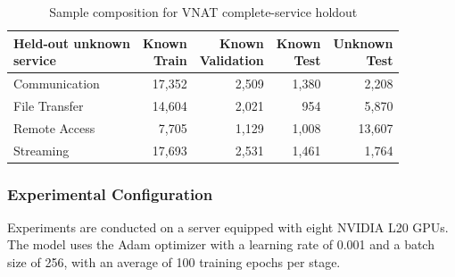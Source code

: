 \begin{table}[!t]
\centering
\begingroup
\renewcommand{\thetable}{4-3}
\caption{Sample composition for VNAT complete-service holdout}\label{tab:source-3}
\fontsize{9}{10.5}\selectfont
\setlength{\tabcolsep}{3pt}
\begin{tabular*}{\columnwidth}{@{\extracolsep{\fill}}lrrrr@{}}
\hline
\shortstack[l]{Held-out unknown\\service} & \shortstack{Known\\Train} & \shortstack{Known\\Validation} & \shortstack{Known\\Test} & \shortstack{Unknown\\Test} \\
\hline
Communication & 17,352 & 2,509 & 1,380 & 2,208 \\
File Transfer & 14,604 & 2,021 & 954 & 5,870 \\
Remote Access & 7,705 & 1,129 & 1,008 & 13,607 \\
Streaming & 17,693 & 2,531 & 1,461 & 1,764 \\
\hline
\end{tabular*}
\endgroup
\end{table}

\subsubsection{Experimental Configuration}
Experiments are conducted on a server equipped with eight NVIDIA L20 GPUs. The model uses the Adam optimizer with a learning rate of 0.001 and a batch size of 256, with an average of 100 training epochs per stage.

